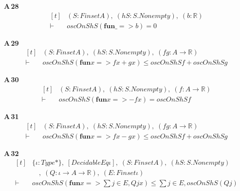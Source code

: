 \noindent\textbf{A\,28}\quad{}
{\footnotesize\[ \begin{aligned}[t]
&(\mathit{S} : \mathit{Finset} \mathit{A}),\; (\mathit{hS} : \mathit{S}.\mathit{Nonempty}),\; (\mathit{b} : \mathbb{R} )\\
\vdash\;&\mathit{oscOn} \mathit{S} \mathit{hS} (\mathbf{fun} \mathit{\_} => \mathit{b}) = 0
\end{aligned} \]}

\noindent\textbf{A\,29}\quad{}
{\footnotesize\[ \begin{aligned}[t]
&(\mathit{S} : \mathit{Finset} \mathit{A}),\; (\mathit{hS} : \mathit{S}.\mathit{Nonempty}),\; (\mathit{f} \mathit{g} : \mathit{A} \to \mathbb{R} )\\
\vdash\;&\mathit{oscOn} \mathit{S} \mathit{hS} (\mathbf{fun} \mathit{x} => \mathit{f} \mathit{x} + \mathit{g} \mathit{x}) \leq \mathit{oscOn} \mathit{S} \mathit{hS} \mathit{f} + \mathit{oscOn} \mathit{S} \mathit{hS} \mathit{g}
\end{aligned} \]}

\noindent\textbf{A\,30}\quad{}
{\footnotesize\[ \begin{aligned}[t]
&(\mathit{S} : \mathit{Finset} \mathit{A}),\; (\mathit{hS} : \mathit{S}.\mathit{Nonempty}),\; (\mathit{f} : \mathit{A} \to \mathbb{R} )\\
\vdash\;&\mathit{oscOn} \mathit{S} \mathit{hS} (\mathbf{fun} \mathit{x} => -\mathit{f} \mathit{x}) = \mathit{oscOn} \mathit{S} \mathit{hS} \mathit{f}
\end{aligned} \]}

\noindent\textbf{A\,31}\quad{}
{\footnotesize\[ \begin{aligned}[t]
&(\mathit{S} : \mathit{Finset} \mathit{A}),\; (\mathit{hS} : \mathit{S}.\mathit{Nonempty}),\; (\mathit{f} \mathit{g} : \mathit{A} \to \mathbb{R} )\\
\vdash\;&\mathit{oscOn} \mathit{S} \mathit{hS} (\mathbf{fun} \mathit{x} => \mathit{f} \mathit{x} - \mathit{g} \mathit{x}) \leq \mathit{oscOn} \mathit{S} \mathit{hS} \mathit{f} + \mathit{oscOn} \mathit{S} \mathit{hS} \mathit{g}
\end{aligned} \]}

\noindent\textbf{A\,32}\quad{}
{\footnotesize\[ \begin{aligned}[t]
&\{ \iota : \mathit{Type}*\},\; [\mathit{DecidableEq} \iota ],\; (\mathit{S} : \mathit{Finset} \mathit{A}),\; (\mathit{hS} : \mathit{S}.\mathit{Nonempty})\\
&\quad ,\; (\mathit{Q} : \iota \to \mathit{A} \to \mathbb{R} ),\; (\mathit{E} : \mathit{Finset} \iota )\\
\vdash\;&\mathit{oscOn} \mathit{S} \mathit{hS} (\mathbf{fun} \mathit{x} => \textstyle\sum \mathit{j} \in \mathit{E}, \mathit{Q} \mathit{j} \mathit{x}) \leq \textstyle\sum \mathit{j} \in \mathit{E}, \mathit{oscOn} \mathit{S} \mathit{hS} (\mathit{Q} \mathit{j})
\end{aligned} \]}

